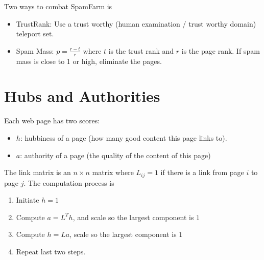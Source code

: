 Two ways to combat SpamFarm is 
    \begin{itemize}
        \item TrustRank: Use a trust worthy (human examination / trust worthy domain) teleport set. 
        \item Spam Mass: $p = \frac{r-t}{r}$ where $t$ is the trust rank and $r$ is the page rank. If spam mass is close to 1 or high, eliminate the pages. 
    \end{itemize}
    
\section{Hubs and Authorities} 
Each web page has two scores: 
    \begin{itemize}
        \item $h$: hubbiness of a page (how many good content this page links to). 
        \item $a$: authority of a page (the quality of the content of this page) 
    \end{itemize}
The link matrix is an $n\times n$ matrix where $L_{ij}=1$ if there is a link from page $i$ to page $j$. The computation process is 
    \begin{enumerate}
        \item Initiate $h = 1$
        \item Compute $a = L^T h$, and scale so the largest component is $1$
        \item Compute $h = La$, scale so the largest component is $1$
        \item Repeat last two steps. 
    \end{enumerate}